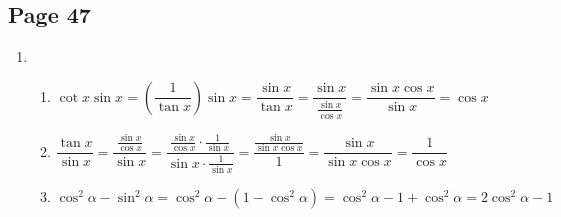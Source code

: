 \documentclass{article}
\newenvironment{solutions}[1]
{\subsection*{#1}
 \begin{enumerate}[leftmargin=1.5em]}
{\end{enumerate}}
\newcommand{\solution}{\item}
\newenvironment{subsolutions}
{\begin{enumerate}}
{\end{enumerate}}
\newcommand{\subsolution}{\item}
\begin{document}
\begin{solutions}{Page 47}
$\begin{aligned}[t]
\frac{\sin{\alpha}}{\cos{\alpha}} &= \tan{\alpha} = \frac{1}{\sqrt{3}} \\
\frac{\sin^{2}{\alpha}}{\cos^{2}{\alpha}} &= \frac{1}{3} \\[1ex]
\frac{1-\cos^{2}{\alpha}}{\cos^{2}{\alpha}} &= \frac{1}{3} \\
3*\frac{1-\cos^{2}{\alpha}}{\cos^{2}{\alpha}} &= 3*\frac{1}{3} \\
\frac{3*(1-\cos^{2}{\alpha})}{\cos^{2}{\alpha}} &= 1 \\
3*(1-\cos^{2}{\alpha}) &= \cos^{2}{\alpha} \\
3-3\cos^{2}{\alpha} &= \cos^{2}{\alpha} \\
3 &= 4\cos^{2}{\alpha} \\
\frac{3}{4} &= \cos^{2}{\alpha} \\
\frac{\sqrt{3}}{2} &= \cos{\alpha}
\end{aligned}$

And then to check our solution we can calculate the fraction we are given $\frac{1}{\sqrt{3}}$
from our $\cos{\alpha}$ and $\sin{\alpha}$ fractions.
$\begin{aligned}[t]
\frac{\frac{1}{2}}{\frac{\sqrt{3}}{2}} \\
\frac{2}{2*\sqrt{3}} \\
\frac{1}{\sqrt{3}}
\end{aligned}$

\solution %
\begin{subsolutions}
\subsolution %
$\cot{x}\sin{x} = \left(\dfrac{1}{\tan{x}}\right)\sin{x} = \dfrac{\sin{x}}{\tan{x}} = \dfrac{\sin{x}}{\frac{\sin{x}}{\cos{x}}} = \dfrac{\sin{x}\cos{x}}{\sin{x}} = \cos{x}$


\subsolution %
$\dfrac{\tan{x}}{\sin{x}} = \dfrac{\frac{\sin{x}}{\cos{x}}}{\sin{x}} = \dfrac{\frac{\sin{x}}{\cos{x}}\cdot\frac{1}{\sin{x}}}{\sin{x}\cdot\frac{1}{\sin{x}}} = \dfrac{\frac{\sin{x}}{\sin{x}\cos{x}}}{1} = \dfrac{\sin{x}}{\sin{x}\cos{x}} = \dfrac{1}{\cos{x}}$


\subsolution %
$\cos^{2}{\alpha} - \sin^{2}{\alpha} = \cos^{2}{\alpha} - (1 - \cos^{2}{\alpha}) = \cos^{2}{\alpha} - 1 + \cos^{2}{\alpha} = 2\cos^{2}{\alpha} - 1$


\end{subsolutions}
\end{solutions}
\end{document}
